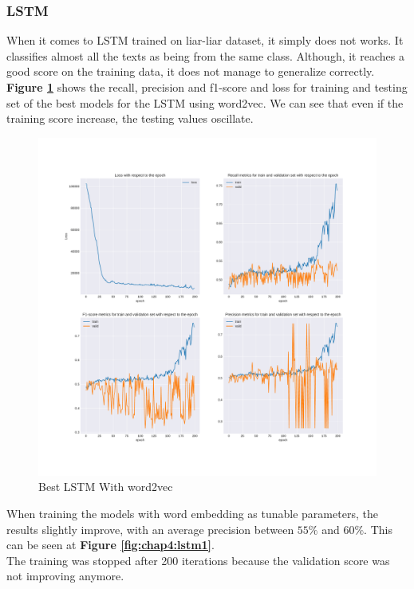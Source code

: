 \subsubsection{LSTM}
When it comes to LSTM trained on liar-liar dataset, it simply does not works. It classifies almost all the texts as being from the same class. Although, it reaches a good score on the training data, it does not manage to generalize correctly. \textbf{Figure \ref{fig:chap4:lstm2}} shows the recall, precision and f1-score and loss for training and testing set of the best models for the LSTM using word2vec. We can see that even if the training score increase, the testing values oscillate. \\
\begin{figure}
 \centering
 \includegraphics[width=\textwidth]{images/chapitre4/lstm2}
 \caption{Best LSTM With word2vec}
 \label{fig:chap4:lstm2}
\end{figure}
When training the models with word embedding as tunable parameters, the results slightly improve, with an average precision between $55\%$ and $60\%$. This can be seen at \textbf{Figure \ref{fig:chap4:lstm1}}. \\
The training was stopped after 200 iterations because the validation score was not improving anymore. 
